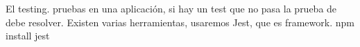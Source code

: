 El testing.
    pruebas en una aplicación, si hay un test que no pasa la prueba de debe resolver.
    Existen varias herramientas, usaremos Jest, que es framework.
    npm install jest 
